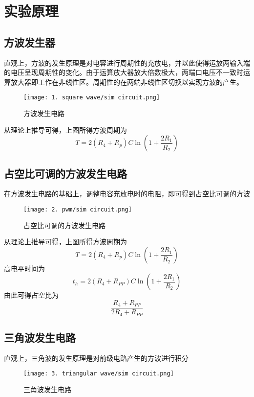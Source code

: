 \documentclass[UTF8]{ctexart}
\numberwithin{figure}{subsection}
\numberwithin{table}{subsection}
\numberwithin{equation}{subsection}
\begin{document}
\section{实验原理}
\subsection{方波发生器}
\par 直观上，方波的发生原理是对电容进行周期性的充放电，并以此使得运放两输入端的电压呈现周期性的变化。由于运算放大器放大倍数极大，两端口电压不一致时运算放大器即工作在非线性区。周期性的在两端非线性区切换以实现方波的产生。
\begin{figure}[H]
    \begin{center}
        \caption{方波发生电路}
        \texttt{[image: 1. square wave/sim circuit.png]}
    \end{center}
\end{figure}

\par 从理论上推导可得，上图所得方波周期为\[T = 2\left(R_4 + R_p \right) C \ln \left(1+\frac{2R_1}{R_2}\right)\]

\subsection{占空比可调的方波发生电路}
\par 在方波发生电路的基础上，调整电容充放电时的电阻，即可得到占空比可调的方波

\begin{figure}[H]
    \begin{center}
        \caption{占空比可调的方波发生电路}
        \texttt{[image: 2. pwm/sim circuit.png]}
    \end{center}
\end{figure}

\par 从理论上推导可得，上图所得方波周期为\[T = 2\left(R_4 + R_p \right) C \ln \left(1+\frac{2R_1}{R_2}\right)\]
高电平时间为\[t_h = 2\left(R_4 + R_{PP} \right) C \ln \left(1+\frac{2R_1}{R_2}\right)\]
由此可得占空比为
\[\frac{R_4 + R_{PP}}{2R_4 + R_{PP}}\]

\subsection{三角波发生电路}
\par 直观上，三角波的发生原理是对前级电路产生的方波进行积分

\begin{figure}[H]
    \begin{center}
        \caption{三角波发生电路}
        \texttt{[image: 3. triangular wave/sim circuit.png]}
    \end{center}
\end{figure}
\end{document}

